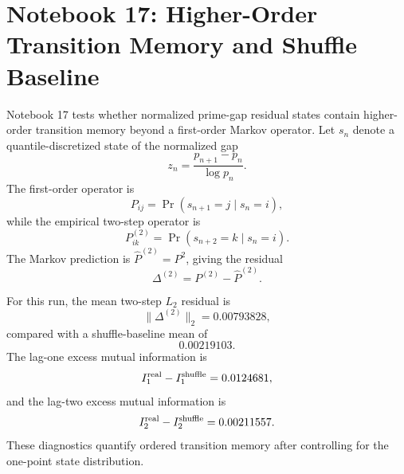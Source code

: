 
\section{Notebook 17: Higher-Order Transition Memory and Shuffle Baseline}

Notebook 17 tests whether normalized prime-gap residual states contain higher-order
transition memory beyond a first-order Markov operator.  Let $s_n$ denote a
quantile-discretized state of the normalized gap
\[
z_n = \frac{p_{n+1}-p_n}{\log p_n}.
\]
The first-order operator is
\[
P_{ij}=\Pr(s_{n+1}=j\mid s_n=i),
\]
while the empirical two-step operator is
\[
P^{(2)}_{ik}=\Pr(s_{n+2}=k\mid s_n=i).
\]
The Markov prediction is $\widehat{P}^{(2)}=P^2$, giving the residual
\[
\Delta^{(2)} = P^{(2)}-\widehat{P}^{(2)}.
\]

For this run, the mean two-step $L_2$ residual is
\[
\|\Delta^{(2)}\|_2 = 0.00793828,
\]
compared with a shuffle-baseline mean of
\[
0.00219103.
\]
The lag-one excess mutual information is
\[
I_1^{\rm real}-I_1^{\rm shuffle} =
0.0124681,
\]
and the lag-two excess mutual information is
\[
I_2^{\rm real}-I_2^{\rm shuffle} =
0.00211557.
\]
These diagnostics quantify ordered transition memory after controlling for the
one-point state distribution.
